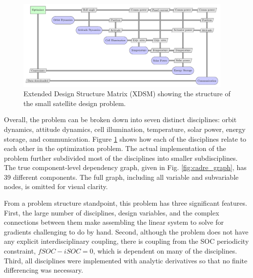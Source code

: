 \documentclass[]{aiaa-tc} %
\begin{document}
    \begin{figure}[!htbp]
        \centering
        \includegraphics[width=0.95\textwidth]{xdsm/cadre_xdsm}
        \caption{Extended Design Structure Matrix (XDSM) showing the structure of the small satellite design problem.}
        \label{fig:cadre_xdsm}
    \end{figure}

    Overall, the problem can be broken down into seven distinct disciplines: orbit dynamics, attitude dynamics, cell illumination,
    temperature, solar power, energy storage, and communication. Figure \ref{fig:cadre_xdsm} shows how each of the disciplines
    relate to each other in the optimization problem. The actual implementation of the problem further
    subdivided most of the disciplines into smaller subdisciplines. The true component-level dependency
    graph, given in Fig. \ref{fig:cadre_graph}, has 39 different components. The full graph, including all variable and
    subvariable nodes, is omitted for visual clarity.

    From a problem structure standpoint, this problem has three significant features. First, the large number of
    disciplines, design variables, and the complex connections between them make assembling the linear system to solve for gradients
    challenging to do by hand. Second, although the problem does not have any explicit interdisciplinary coupling,
    there is coupling from the SOC periodicity constraint, $fSOC - iSOC = 0$, which is dependent on many of the
    disciplines. Third, all disciplines were implemented with analytic derivatives so that no finite differencing was
    necessary.
\end{document}
